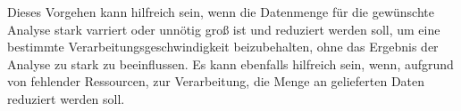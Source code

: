 Dieses Vorgehen kann hilfreich sein, 
wenn die Datenmenge für die gewünschte Analyse stark varriert oder unnötig groß ist und reduziert werden soll, 
um eine bestimmte Verarbeitungsgeschwindigkeit beizubehalten, 
ohne das Ergebnis der Analyse zu stark zu beeinflussen.
Es kann ebenfalls hilfreich sein, 
wenn, aufgrund von fehlender Ressourcen, zur Verarbeitung, die Menge an gelieferten Daten reduziert werden soll.

